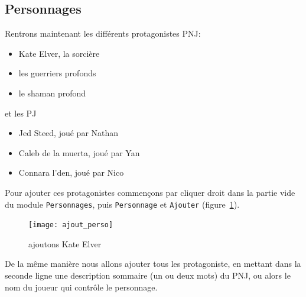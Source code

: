 \documentclass[a4paper,12pt]{article}
\newcommand*{\interfaceitem}[1]{\texttt{#1}}
\begin{document}
\subsection{Personnages}
Rentrons maintenant les différents protagonistes PNJ:
\begin{itemize}
    \item Kate Elver, la sorcière
    \item les guerriers profonds
    \item le shaman profond
\end{itemize}
et les PJ
\begin{itemize}
    \item Jed Steed, joué par Nathan
    \item Caleb de la muerta, joué par Yan
    \item Connara l'den, joué par Nico
\end{itemize}
Pour ajouter ces protagonistes commençons par cliquer droit dans la partie vide du module \interfaceitem{Personnages}, puis \interfaceitem{Personnage} et \interfaceitem{Ajouter} (figure~\ref{ajout_perso}).
\begin{figure}[h!]
    \texttt{[image: ajout\_perso]}
    \caption{ajoutons Kate Elver}
    \label{ajout_perso}
\end{figure}
De la même manière nous allons ajouter tous les protagoniste, en mettant dans la seconde ligne une description sommaire (un ou deux mots) du PNJ, ou alors le nom du joueur qui contrôle le personnage.
\end{document}

